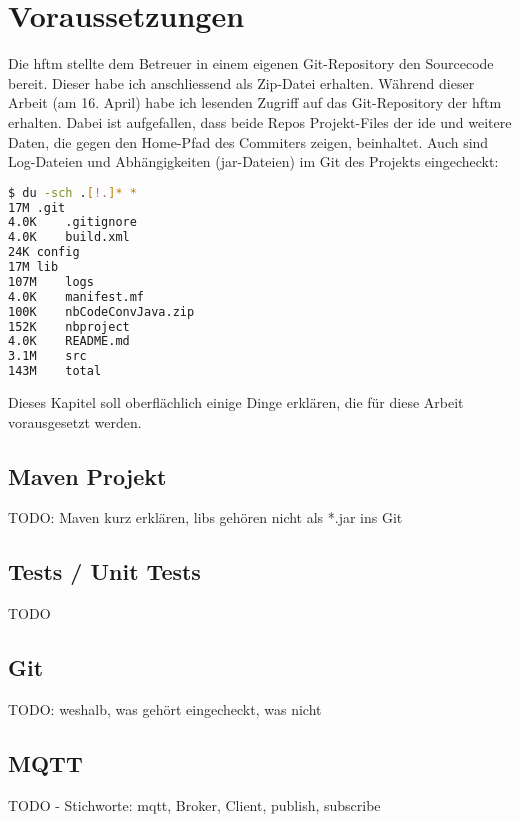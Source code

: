 \chapter{Voraussetzungen}
Die \acrshort{hftm} stellte dem Betreuer in einem eigenen Git-Repository den Sourcecode bereit. Dieser habe ich anschliessend als Zip-Datei erhalten. Während dieser Arbeit (am 16. April) habe ich lesenden Zugriff auf das Git-Repository der \acrshort{hftm} erhalten\cite{gitlab.com/solidus/hefei}. Dabei ist aufgefallen, dass beide Repos Projekt-Files der \acrshort{ide} und weitere Daten, die gegen den Home-Pfad des Commiters zeigen, beinhaltet. Auch sind Log-Dateien und Abhängigkeiten (jar-Dateien) im Git des Projekts eingecheckt:
\begin{lstlisting}[caption={Listing der Daten im Git-Repository 'gitlab.com/solidus/hefei'},language=Bash, columns=fixed]
$ du -sch .[!.]* *
17M	.git
4.0K	.gitignore
4.0K	build.xml
24K	config
17M	lib
107M	logs
4.0K	manifest.mf
100K	nbCodeConvJava.zip
152K	nbproject
4.0K	README.md
3.1M	src
143M	total
\end{lstlisting}
Dieses Kapitel soll oberflächlich einige Dinge erklären, die für diese Arbeit vorausgesetzt werden.
\section{Maven Projekt}
TODO: Maven kurz erklären, libs gehören nicht als *.jar ins Git
\section{Tests / Unit Tests}
TODO
\section{Git}
TODO: weshalb, was gehört eingecheckt, was nicht
\section{MQTT}
\label{sec:mqtt}
TODO - Stichworte: \acrshort{mqtt}, Broker, Client, publish, subscribe
